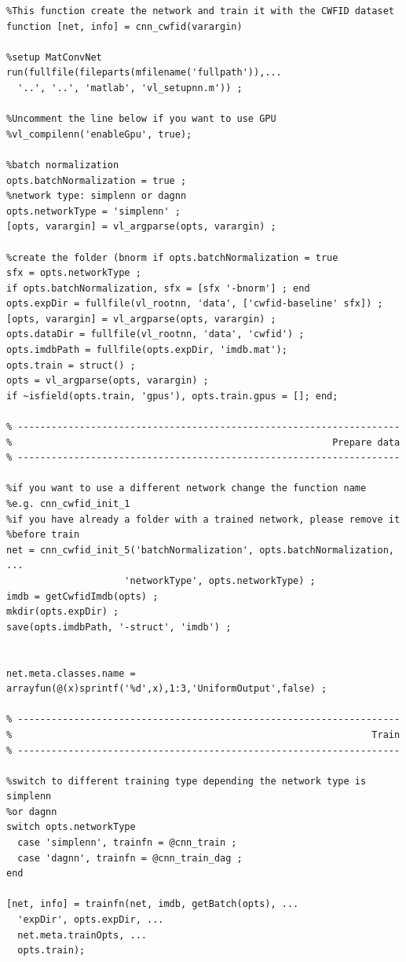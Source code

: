 \documentclass[]{report}
\begin{document}
\begin{lstlisting}
%This function create the network and train it with the CWFID dataset
function [net, info] = cnn_cwfid(varargin)

%setup MatConvNet
run(fullfile(fileparts(mfilename('fullpath')),...
  '..', '..', 'matlab', 'vl_setupnn.m')) ;

%Uncomment the line below if you want to use GPU
%vl_compilenn('enableGpu', true);

%batch normalization
opts.batchNormalization = true ;
%network type: simplenn or dagnn
opts.networkType = 'simplenn' ;
[opts, varargin] = vl_argparse(opts, varargin) ;

%create the folder (bnorm if opts.batchNormalization = true
sfx = opts.networkType ;
if opts.batchNormalization, sfx = [sfx '-bnorm'] ; end
opts.expDir = fullfile(vl_rootnn, 'data', ['cwfid-baseline' sfx]) ;
[opts, varargin] = vl_argparse(opts, varargin) ;
opts.dataDir = fullfile(vl_rootnn, 'data', 'cwfid') ;
opts.imdbPath = fullfile(opts.expDir, 'imdb.mat');
opts.train = struct() ;
opts = vl_argparse(opts, varargin) ;
if ~isfield(opts.train, 'gpus'), opts.train.gpus = []; end;

% --------------------------------------------------------------------
%                                                         Prepare data
% --------------------------------------------------------------------

%if you want to use a different network change the function name
%e.g. cnn_cwfid_init_1
%if you have already a folder with a trained network, please remove it
%before train
net = cnn_cwfid_init_5('batchNormalization', opts.batchNormalization, ...
                     'networkType', opts.networkType) ;
imdb = getCwfidImdb(opts) ;
mkdir(opts.expDir) ;
save(opts.imdbPath, '-struct', 'imdb') ;


net.meta.classes.name = arrayfun(@(x)sprintf('%d',x),1:3,'UniformOutput',false) ;

% --------------------------------------------------------------------
%                                                                Train
% --------------------------------------------------------------------

%switch to different training type depending the network type is simplenn
%or dagnn
switch opts.networkType
  case 'simplenn', trainfn = @cnn_train ;
  case 'dagnn', trainfn = @cnn_train_dag ;
end

[net, info] = trainfn(net, imdb, getBatch(opts), ...
  'expDir', opts.expDir, ...
  net.meta.trainOpts, ...
  opts.train);


\end{lstlisting}
\end{document}
